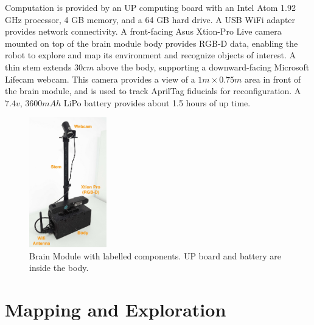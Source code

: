 \documentclass[conference]{IEEEtran}
\begin{document}
Computation is provided by an UP computing board with an Intel Atom 1.92 GHz processor, 4 GB memory, and a 64 GB hard drive. A USB WiFi adapter provides network connectivity. A front-facing Asus Xtion-Pro Live camera mounted on top of the brain module body provides RGB-D data, enabling the robot to explore and map its environment and recognize objects of interest.  A thin stem extends $30cm$ above the body, supporting a downward-facing Microsoft Lifecam webcam.  This camera provides a view of a  $1m\times0.75m$ area in front of the brain module, and is used to track AprilTag \cite{olson2011apriltag} fiducials for reconfiguration. A $7.4v$, $3600mAh$ LiPo battery provides about 1.5 hours of up time.
%
\begin{figure}
\begin{center}
\includegraphics[width=0.3\textwidth]{images/sensor_module2.jpg}
\caption{Brain Module with labelled components.  UP board and battery are inside the body.      }
\label{fig:sensor-module}
\end{center}
\vspace{-2em}
\end{figure}

\section{Mapping and Exploration}
\label{sec:exploration}
%
\end{document}

